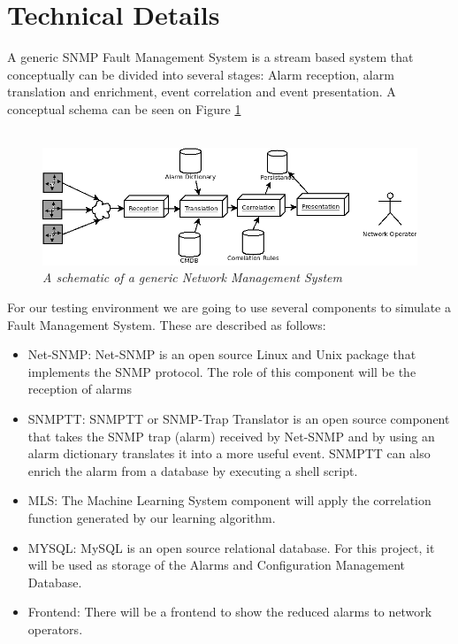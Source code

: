 \documentclass[10pt,a4paper]{article}
\begin{document}
  \section{Technical Details}
A generic SNMP Fault Management System is a stream based system that conceptually can be divided into several stages: Alarm reception, alarm translation and enrichment, event correlation and event presentation. A conceptual schema can be seen on Figure \ref{fig:nms_generaldiagram}
\\\
\begin{figure}[H]
 \includegraphics[scale=0.4]{NMS_GeneralDiagram.png}
  \centering
  \caption{\textit{A schematic of a generic Network Management System}}
  \label{fig:nms_generaldiagram}
\end{figure}	

For our testing environment we are going to use several components to simulate a Fault Management System. These are described as follows:

\begin{itemize}
  \item Net-SNMP: Net-SNMP is an open source Linux and Unix package that implements the SNMP protocol. The role of this component will be the reception of alarms\cite{netsnmp}
  \item SNMPTT: SNMPTT or SNMP-Trap Translator is an open source component that takes the SNMP trap (alarm) received by Net-SNMP and by using an alarm dictionary translates it into a more useful event. SNMPTT can also enrich the alarm from a database by executing a shell script.\cite{snmptt}
  \item MLS: The Machine Learning System component will apply the correlation function generated by our learning algorithm.\cite{sec}
  \item MYSQL: MySQL is an open source relational database. For this project, it will be used as storage of the Alarms and Configuration Management Database.
  \item Frontend: There will be a frontend to show the reduced alarms to network operators.
\end{itemize}
\end{document}
